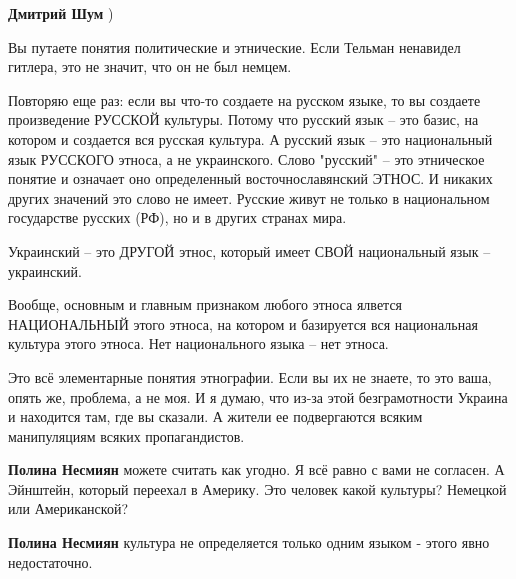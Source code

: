 \begin{itemize}
\begin{itemize}
 
\textbf{Дмитрий Шум} ) 

Вы путаете понятия политические и этнические. Если Тельман ненавидел гитлера,
это не значит, что он не был немцем.

Повторяю еще раз: если вы что-то создаете на русском языке, то вы создаете
произведение РУССКОЙ культуры. Потому что русский язык – это базис, на котором
и создается вся русская культура. А русский язык – это национальный язык
РУССКОГО этноса, а не украинского. Слово "русский" – это этническое понятие и
означает оно определенный восточнославянский ЭТНОС. И никаких других значений
это слово не имеет. Русские живут не только в национальном государстве русских
(РФ), но и в других странах мира.

Украинский – это ДРУГОЙ этнос, который имеет СВОЙ национальный язык –
украинский.

Вообще, основным и главным признаком любого этноса ялвется НАЦИОНАЛЬНЫЙ этого
этноса, на котором и базируется вся национальная культура этого этноса. Нет
национального языка – нет этноса.

Это всё элементарные понятия этнографии. Если вы их не знаете, то это ваша,
опять же, проблема, а не моя. И я думаю, что из-за этой безграмотности Украина
и находится там, где вы сказали. А жители ее подвергаются всяким манипуляциям
всяких пропагандистов.

 
\textbf{Полина Несмиян} можете считать как угодно. Я всё равно с вами не
согласен. А Эйнштейн, который переехал в Америку. Это человек какой культуры?
Немецкой или Американской?

 
\textbf{Полина Несмиян} культура не определяется только одним языком - этого явно недостаточно.


\end{itemize}
\end{itemize}
